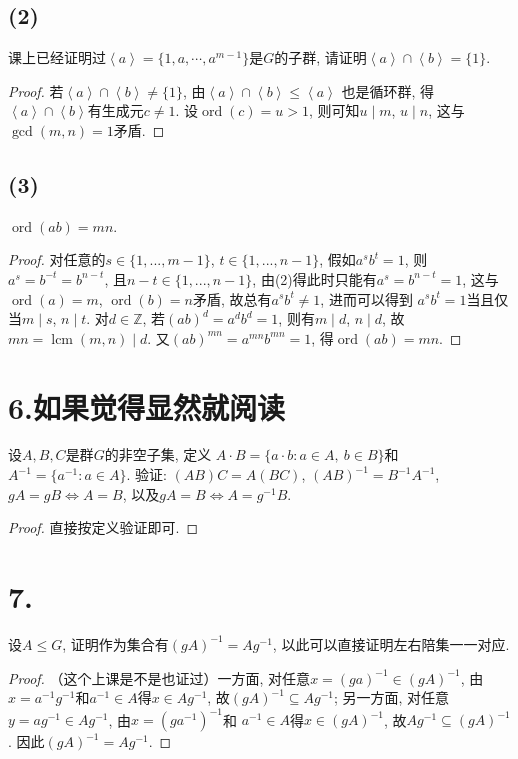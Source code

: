 \documentclass[12pt, a4paper, fontset=windows]{ctexart}
\newcommand{\Z}{\mathbb{Z}}
\newcommand{\gen}[1]{\left\langle{#1}\right\rangle}
\newcommand{\kh}[1]{（{#1}）} %
\newcommand{\lcm}{\operatorname{lcm}}
\newcommand{\ord}{\operatorname{ord}}
\begin{document}
\subsection*{(2)}

课上已经证明过$\gen{a}=\{1,a,\cdots,a^{m-1}\}$是$G$的子群, 
请证明$\gen{a}\cap\gen{b}=\{1\}$. 

\begin{proof}
若$\gen{a}\cap\gen{b}\ne\{1\}$, 
由$\gen{a}\cap\gen{b}\le\gen{a}$
也是循环群, 得$\gen{a}\cap\gen{b}$有生成元$c\ne 1$. 
设$\ord(c)=u>1$, 则可知$u\mid m$, $u\mid n$, 这与$\gcd(m,n)=1$矛盾. 
\end{proof}

\subsection*{(3)}
\label{ord-mul}

$\ord(ab)=mn$. 

\begin{proof}
对任意的$s\in\{1,...,m-1\}$, $t\in\{1,...,n-1\}$, 假如$a^sb^t=1$, 
则$a^s=b^{-t}=b^{n-t}$, 且$n-t\in\{1,...,n-1\}$, 由(2)得此时只能有$a^s=b^{n-t}=1$, 
这与$\ord(a)=m$, $\ord(b)=n$矛盾, 故总有$a^sb^t\ne 1$, 进而可以得到
$a^sb^t=1$当且仅当$m\mid s$, $n\mid t$. 对$d\in\Z$, 若$(ab)^d=a^db^d=1$, 
则有$m\mid d$, $n\mid d$, 故$mn=\lcm(m,n)\mid d$. 又$(ab)^{mn}=a^{mn}b^{mn}=1$, 得$\ord(ab)=mn$. 
\end{proof}

\section*{6.\normalsize 如果觉得显然就阅读}

设$A,B,C$是群$G$的非空子集, 定义
$A\cdot B=\{a\cdot b:a\in A,\ b\in B\}$和
$A^{-1}=\{a^{-1}:a\in A\}$. 
验证: $(AB)C=A(BC)$, $(AB)^{-1}=B^{-1}A^{-1}$, 
$gA=gB\iff A=B$, 以及$gA=B\iff A=g^{-1}B$. 

\begin{proof}
直接按定义验证即可. 
\end{proof}

\section*{7.}

设$A\le G$, 证明作为集合有$(gA)^{-1}=Ag^{-1}$, 
以此可以直接证明左右陪集一一对应. 

\begin{proof}
\kh{这个上课是不是也证过}一方面, 对任意$x=(ga)^{-1}\in(gA)^{-1}$, 
由$x=a^{-1}g^{-1}$和$a^{-1}\in A$得$x\in Ag^{-1}$, 故$(gA)^{-1}\subseteq Ag^{-1}$; 
另一方面, 对任意$y=ag^{-1}\in Ag^{-1}$, 由$x=(ga^{-1})^{-1}$和
$a^{-1}\in A$得$x\in(gA)^{-1}$, 故$Ag^{-1}\subseteq(gA)^{-1}$. 
因此$(gA)^{-1}=Ag^{-1}$. 
\end{proof}
\end{document}
